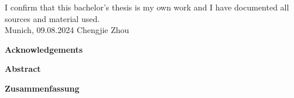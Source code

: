 \documentclass[11pt,
               a4paper,
               bibtotoc,
               idxtotoc,
               headsepline,
               footsepline,
               footexclude,
               BCOR12mm,
               DIV13,
               openany,   %
               ]
               {scrbook}
\def\doctype{Bachelor's Thesis\xspace}
\def\author{Chengjie Zhou}
\def\date{09.08.2024}
\begin{document}
\addtolength{\hoffset}{\bcorcor}
\newpage


\cleardoubleemptypage

\thispagestyle{empty}
\vspace*{0.7\textheight}
\noindent
I confirm that this \MakeLowercase{\doctype} is my own work and I have documented all sources and material used.\\

\vspace{15mm}
\noindent
Munich, \date \hspace{5cm} \author
\cleardoubleemptypage


{}
\vspace*{2cm}
\begin{center}
    {\Large \bf Acknowledgements}
\end{center}
\vspace{1cm}

\lipsum[1]

\cleardoublepage


{}
\vspace*{2cm}
\begin{center}
    {\Large \bf Abstract}
\end{center}
\vspace{1cm}

\cleardoublepage

{}
\vspace*{2cm}
\begin{center}
    {\Large \bf Zusammenfassung}
\end{center}
\vspace{1cm}

\cleardoublepage
\end{document}
